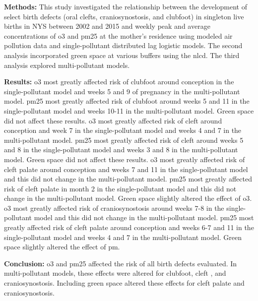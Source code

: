 \begin{titlepage}
\textbf{Methods:} 
This study investigated the relationship between the development of select birth defects (oral clefts, craniosynostosis, and clubfoot) in singleton live births in NYS between 2002 and 2015 and weekly peak and average concentrations of \gls{o3} and \gls{pm25} at the mother's residence using modeled air pollution data and single-pollutant distributed lag logistic models. The second analysis incorporated green space at various buffers using the \gls{nlcd}. The third analysis explored multi-pollutant models.  

\textbf{Results:} 
\gls{o3} most greatly affected risk of clubfoot around conception in the single-pollutant model and weeks 5 and 9 of pregnancy in the multi-pollutant model. \gls{pm25} most greatly affected risk of clubfoot around weeks 5 and 11 in the single-pollutant model and weeks 10-11 in the multi-pollutant model. Green space did not affect these results. 
\gls{o3} most greatly affected risk of cleft \lcp around conception and week 7 in the single-pollutant model and weeks 4 and 7 in the multi-pollutant model. \gls{pm25} most greatly affected risk of cleft \lcp around weeks 5 and 8 in the single-pollutant model and weeks 3 and 8 in the multi-pollutant model. Green space did not affect these results. 
\gls{o3} most greatly affected risk of cleft palate around conception and weeks 7 and 11 in the single-pollutant model and this did not change in the multi-pollutant model. \gls{pm25} most greatly affected risk of cleft palate in month 2 in the single-pollutant model and this did not change in the multi-pollutant model. Green space slightly altered the effect of \gls{o3}. 
\gls{o3} most greatly affected risk of craniosynostosis around weeks 7-8 in the single-pollutant model and this did not change in the multi-pollutant model. \gls{pm25} most greatly affected risk of cleft palate around conception and weeks 6-7 and 11 in the single-pollutant model and weeks 4 and 7 in the multi-pollutant model. Green space slightly altered the effect of \gls{pm}.   

\textbf{Conclusion:} 
\gls{o3} and \gls{pm25} affected the risk of all birth defects evaluated. In multi-pollutant models, these effects were altered for clubfoot, cleft \lcp, and craniosynostosis. Including green space altered these effects for cleft palate and craniosynostosis.

\pagebreak

\end{titlepage}